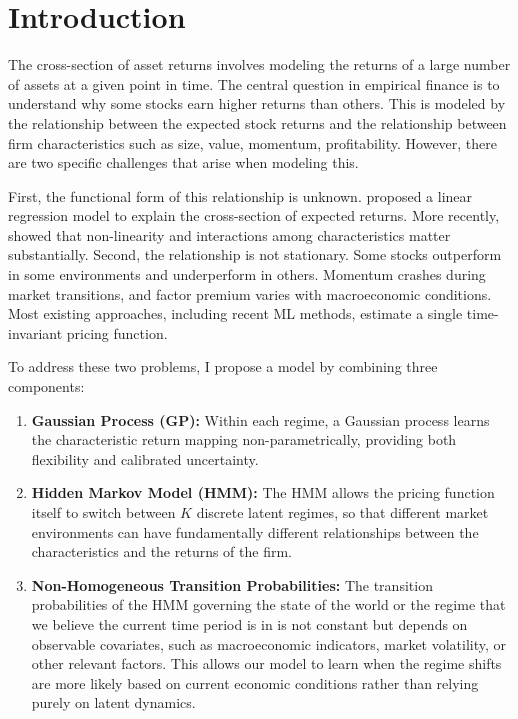 \documentclass[11pt]{article}
\begin{document}
\section{Introduction}
The cross-section of asset returns involves modeling the returns of a large number of assets at a given point in time. The central question in empirical finance is to understand why some stocks earn higher returns than others. This is modeled by the relationship between the expected stock returns and the relationship between firm characteristics such as size, value, momentum, profitability. However, there are two specific challenges that arise when modeling this. 

First, the functional form of this relationship is unknown. \cite{fama_risk_1973} proposed a linear regression model to explain the cross-section of expected returns. More recently, \cite{gu_empirical_2020} showed that non-linearity and interactions among characteristics matter substantially. Second, the relationship is not stationary. Some stocks outperform in some environments and underperform in others. Momentum crashes during market transitions, and factor premium varies with macroeconomic conditions. Most existing approaches, including recent ML methods, estimate a single time-invariant pricing function. 

To address these two problems, I propose a model by combining three components:
\begin{enumerate}
    \item \textbf{Gaussian Process (GP):} Within each regime, a Gaussian process learns the characteristic return mapping non-parametrically, providing both flexibility and calibrated uncertainty. 
    \item \textbf{Hidden Markov Model (HMM): }The HMM allows the pricing function itself to switch between $K$ discrete latent regimes, so that different market environments can have fundamentally different relationships between the characteristics and the returns of the firm. 
    \item \textbf{Non-Homogeneous Transition Probabilities:} The transition probabilities of the HMM governing the state of the world or the regime that we believe the current time period is in is not constant but depends on observable covariates, such as macroeconomic indicators, market volatility, or other relevant factors. This allows our model to learn when the regime shifts are more likely based on current economic conditions rather than relying purely on latent dynamics. 
\end{enumerate}
\end{document}
